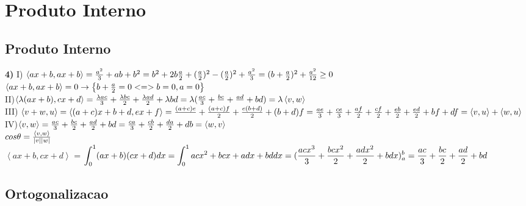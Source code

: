 \documentclass[a4paper,12pt]{report}
\begin{document}
\chapter{Produto Interno }
\section{Produto Interno}
\textbf{4)}
I)
$\left <ax+b,ax+b \right > = {a^2\over3} +ab + b^2 = b^2 + 2b{a\over 2} + ({a\over2})^2 - ({a\over2})^2 + {a^2\over 3} = (b+ {a\over2})^2 + {a^2\over 12} \ge 0 $\\

$\left <  ax + b, ax+b \right > = 0 \rightarrow\left \{ b+ {a\over2} = 0 <=> b = 0, a = 0\right \}$ \\

II)$ \left < \lambda (ax+b), cx+d \right > = {\lambda ac\over 3} + {\lambda bc\over2} + {\lambda ad\over 2} + \lambda bd = \lambda ( {ac\over3} + {bc\over} + {ad\over} + bd) = \lambda \left < v,w \right >$ \\

III) $\left < v+w, u \right > = \left < (a+c)x +b+d,ex+f \right > = {(a+c)e\over} + {(a+c)f\over2} + {e(b+d)\over2} + (b+d)f = {ae\over3}+{ce\over3}+{af\over2}+ {cf\over2}+ {eb\over2}+{ed\over2} + bf +df = \left < v, u \right > + \left < w,u \right >$ \\

IV)$ \left <v,w \right> = {ac\over3}+ {bc\over2} + {ad\over2} +bd = {ca\over3} + {cb\over2} + {da\over2} + db = \left < w,v \right >$ \\

$cos \theta = {\left < v,w \right >\over \left | v \right | \left | w \right |} $\\

$\left < ax+b,cx+d \right >$ = $\displaystyle \int_{0}^{1} (ax+b)(cx+d)dx = \displaystyle \int_{0}^{1} acx^2 + bcx + adx + bddx = ({acx^3 \over3} + {bcx^2 \over2} + {adx^2 \over2} + bdx) _a^b = {ac\over3} + {bc\over2} + {ad\over2} +bd  $

\section{Ortogonalizacao}
\end{document}
